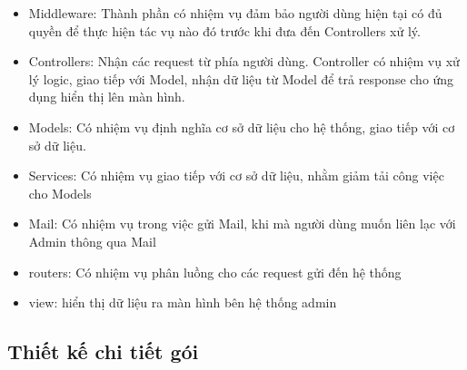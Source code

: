 \documentclass[../DoAn.tex]{subfiles}
\begin{document}
\begin{itemize}
    \item Middleware: Thành phần có nhiệm vụ đảm bảo người dùng hiện tại có đủ quyền để thực hiện tác vụ nào đó trước khi đưa đến Controllers xử lý.
    \item Controllers: Nhận các request từ phía người dùng. Controller có nhiệm vụ xử lý logic, giao tiếp với Model, nhận dữ liệu từ Model để trả response cho ứng dụng hiển thị lên màn hình.
    \item Models: Có nhiệm vụ định nghĩa cơ sở dữ liệu cho hệ thống, giao tiếp với cơ sở dữ liệu.
    \item Services: Có nhiệm vụ giao tiếp với cơ sở dữ liệu, nhằm giảm tải công việc cho Models
    \item Mail: Có nhiệm vụ trong việc gửi Mail, khi mà người dùng muốn liên lạc với Admin thông qua Mail
    \item routers: Có nhiệm vụ phân luồng cho các request gửi đến hệ thống
    \item view: hiển thị dữ liệu ra màn hình bên hệ thống admin
\end{itemize}
\subsection{Thiết kế chi tiết gói}
\end{document}
